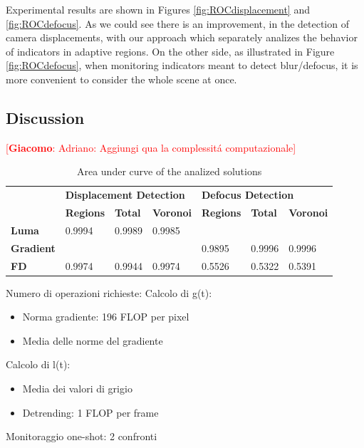 \documentclass{llncs}
\newcommand{\gi}[1]{{\textcolor{red}{[\small \textbf{Giacomo}: #1]}}}
\begin{document}
Experimental results are shown in Figures \ref{fig:ROCdisplacement} and \ref{fig:ROCdefocus}.
As we could see there is an improvement, in the detection of camera displacements, with our approach which separately analizes the behavior of indicators in adaptive regions.
On the other side, as illustrated in Figure \ref{fig:ROCdefocus}, when monitoring indicators meant to detect blur/defocus, it is more convenient to consider the whole scene at once.
\subsection{Discussion}
\gi{Adriano: Aggiungi qua la complessit\'a computazionale}
\begin{table}[tbh]
\centering
\begin{tabular}{l|l|l|l|l|l|l|}
\cline{2-7}
& \multicolumn{3}{l|}{\cellcolor[HTML]{C0C0C0}\textbf{Displacement Detection}}  & \multicolumn{3}{l|}{\cellcolor[HTML]{C0C0C0}\textbf{Defocus Detection}} \\ \cline{2-7} 
& \cellcolor[HTML]{EFEFEF}\textbf{Regions} & \cellcolor[HTML]{EFEFEF}\textbf{Total} & \cellcolor[HTML]{EFEFEF}\textbf{Voronoi} & \cellcolor[HTML]{EFEFEF}\textbf{Regions} & \cellcolor[HTML]{EFEFEF}\textbf{Total} & \cellcolor[HTML]{EFEFEF}\textbf{Voronoi} \\ \hline
\multicolumn{1}{|l|}{\cellcolor[HTML]{EFEFEF}\textbf{Luma}}     & 0.9994 & 0.9989 & 0.9985  &            &            &             \\ \hline
\multicolumn{1}{|l|}{\cellcolor[HTML]{EFEFEF}\textbf{Gradient}} &  		 &  		  &             & 0.9895 & 0.9996 & 0.9996  \\ \hline
\multicolumn{1}{|l|}{\cellcolor[HTML]{EFEFEF}\textbf{FD}}         & 0.9974 & 0.9944 & 0.9974  & 0.5526 & 0.5322 & 0.5391  \\ \hline
\end{tabular}
\caption{Area under curve of the analized solutions}
\label{tab:AUC}
\end{table}

Numero di operazioni richieste:
Calcolo di g(t):
\begin{itemize}
\item Norma gradiente: 196 FLOP per pixel
\item Media delle norme del gradiente
\end{itemize}
Calcolo di l(t):
\begin{itemize}
\item Media dei valori di grigio
\item Detrending: 1 FLOP per frame
\end{itemize}
Monitoraggio one-shot: 2 confronti
\end{document}
